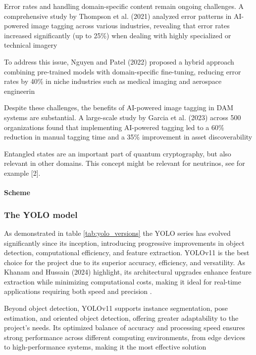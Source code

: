 \documentclass[a4paper,10pt,twocolumn]{article}
\numberwithin{figure}{section}
\numberwithin{table}{section}
\begin{document}
Error rates and handling domain-specific content remain ongoing challenges. A comprehensive study by 
Thompson et al. (2021) analyzed error patterns in AI-powered image tagging across various industries, 
revealing that error rates increased significantly (up to 25\%) when dealing with highly specialized or technical imagery

To address this issue, Nguyen and Patel (2022) proposed a hybrid approach combining pre-trained models with 
domain-specific fine-tuning, reducing error rates by 40\% in niche industries such as medical imaging and aerospace engineerin

Despite these challenges, the benefits of AI-powered image tagging in DAM systems are substantial. A large-scale study by Garcia et al. (2023)
 across 500 organizations found that implementing AI-powered tagging led to a 60\% reduction in manual tagging time and 
 a 35\% improvement in asset discoverability


Entangled states are an important part of quantum cryptography, but also relevant in other
domains. This concept might be relevant for neutrinos, see for example [2].

\paragraph{Scheme}



\subsubsection{The YOLO model}
\vspace{0.3cm}
As demonstrated in table \ref{tab:yolo_versions} the YOLO series has
 evolved significantly since its inception, introducing progressive improvements
  in object detection, computational efficiency, and feature extraction. 
YOLOv11 is the best choice for the project due to its superior accuracy, 
efficiency, and versatility. As Khanam and Hussain (2024) highlight, 
its architectural upgrades enhance feature extraction while minimizing 
computational costs, making it ideal for real-time applications requiring 
both speed and precision \citep{khanam2024yolov11overviewkeyarchitectural}.

\vspace{0.3cm}
Beyond object detection, YOLOv11 supports instance segmentation, 
pose estimation, and oriented object detection, offering greater adaptability 
to the project’s needs. Its optimized balance of accuracy and processing speed 
ensures strong performance across different computing environments, from edge 
devices to high-performance systems, making it the most effective solution
\end{document}
